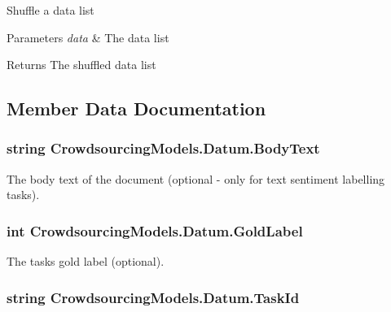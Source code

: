 Shuffle a data list 


\begin{DoxyParams}{Parameters}
{\em data} & The data list\\
\hline
\end{DoxyParams}
\begin{DoxyReturn}{Returns}
The shuffled data list
\end{DoxyReturn}


\subsection{Member Data Documentation}
\hypertarget{class_crowdsourcing_models_1_1_datum_a38025a1cc896d8e6b9add41381e59db7}{}
\subsubsection[{Body\+Text}]{\setlength{\rightskip}{0pt plus 5cm}string Crowdsourcing\+Models.\+Datum.\+Body\+Text}\label{class_crowdsourcing_models_1_1_datum_a38025a1cc896d8e6b9add41381e59db7}


The body text of the document (optional -\/ only for text sentiment labelling tasks). 

\hypertarget{class_crowdsourcing_models_1_1_datum_a236dd06bbd0ef1a2333b5524e0e22db4}{}
\subsubsection[{Gold\+Label}]{\setlength{\rightskip}{0pt plus 5cm}int Crowdsourcing\+Models.\+Datum.\+Gold\+Label}\label{class_crowdsourcing_models_1_1_datum_a236dd06bbd0ef1a2333b5524e0e22db4}


The task\textquotesingle{}s gold label (optional). 

\hypertarget{class_crowdsourcing_models_1_1_datum_a7368e7071cd2d6ff2458763e913cb53e}{}
\subsubsection[{Task\+Id}]{\setlength{\rightskip}{0pt plus 5cm}string Crowdsourcing\+Models.\+Datum.\+Task\+Id}\label{class_crowdsourcing_models_1_1_datum_a7368e7071cd2d6ff2458763e913cb53e}


